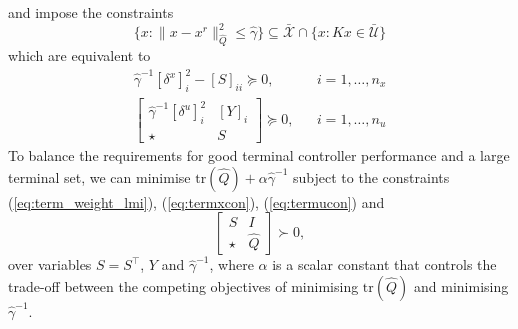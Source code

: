 \documentclass[a4paper, 10 pt, conference]{IEEEconf}
\def\U{\mathcal{U}}
\def\X{\mathcal{X}}
\def\tr{\mathrm{tr}}
\begin{document}
and impose the constraints
\[
\{x : \|x-x^r\|_{\hat{Q}}^2 \leq \hat{\gamma}\} \subseteq \bar{\X} \cap \{ x: Kx \in \bar{\U}\} 
\]
which are equivalent to
\begin{align}
\hat{\gamma}^{-1} [ \delta^x ]_i^2 - [S]_{ii} \succeq 0, &  &i = 1,\ldots,n_x
\label{eq:termxcon}\\
\begin{bmatrix} \hat{\gamma}^{-1}[\delta^u ]_i^2 & [Y]_i \\ \star & S \end{bmatrix} \succeq 0, & & i = 1,\ldots,n_u
\label{eq:termucon}
\end{align}
To balance the requirements for good terminal controller performance and a large terminal set, we can minimise $\tr(\hat{Q}) + \alpha \hat{\gamma}^{-1}$ subject to the constraints (\ref{eq:term_weight_lmi}), (\ref{eq:termxcon}), (\ref{eq:termucon}) and
\begin{equation}\label{eq:Sbnd}
\begin{bmatrix} S & I \\ \star & \hat{Q} \end{bmatrix} \succ 0 ,
\end{equation}
over variables $S=S^\top$, $Y$ and $\hat{\gamma}^{-1}$, where $\alpha$ is a scalar constant that controls the trade-off between the competing objectives of minimising $\tr(\hat{Q})$ and minimising $\hat{\gamma}^{-1}$.

\end{document}
